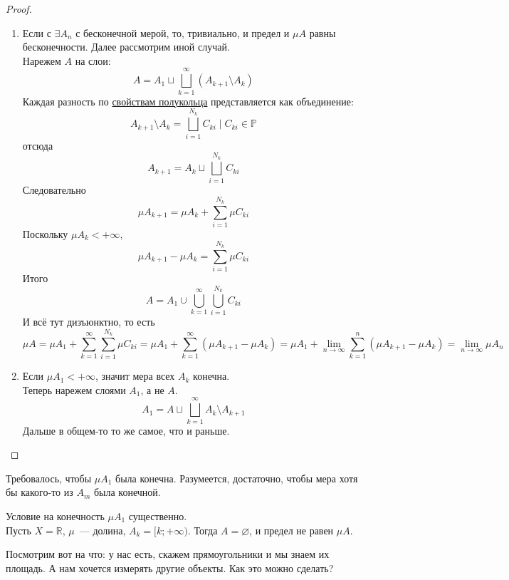 \documentclass{article}
\begin{document}
    \begin{proof}
        \begin{enumerate}
            \item
            Если с $\exists A_n$ с бесконечной мерой, то, тривиально, и предел и $\mu A$ равны бесконечности. Далее рассмотрим иной случай.\\
            Нарежем $A$ на слои:
            $$
            A=A_1\sqcup\bigsqcup\limits_{k=1}^\infty(A_{k+1}\setminus A_k)
            $$
            Каждая разность по \hyperref[prop:1 полукольца]{свойствам полукольца} представляется как объединение:
            $$
            A_{k+1}\setminus A_k=\bigsqcup\limits_{i=1}^{N_k}C_{ki}\mid C_{ki}\in\mathbb P
            $$
            отсюда
            $$
            A_{k+1}=A_k\sqcup\bigsqcup\limits_{i=1}^{N_k}C_{ki}
            $$
            Следовательно
            $$
            \mu A_{k+1}=\mu A_k+\sum\limits_{i=1}^{N_k}\mu C_{ki}
            $$
            Поскольку $\mu A_k<+\infty$,
            $$
            \mu A_{k+1}-\mu A_k=\sum\limits_{i=1}^{N_k}\mu C_{ki}
            $$
            Итого
            $$
            A=A_1\cup\bigcup\limits_{k=1}^\infty\bigcup\limits_{i=1}^{N_k}C_{ki}
            $$
            И всё тут дизъюнктно, то есть
            $$
            \mu A=\mu A_1+\sum\limits_{k=1}^\infty\sum\limits_{i=1}^{N_k}\mu C_{ki}=\mu A_1+\sum\limits_{k=1}^\infty(\mu A_{k+1}-\mu A_k)=\mu A_1+\lim_{n\to\infty}\sum\limits_{k=1}^n(\mu A_{k+1}-\mu A_k)=\lim_{n\to\infty}\mu A_n
            $$
            \item Если $\mu A_1<+\infty$, значит мера всех $A_k$ конечна.\\
            Теперь нарежем слоями $A_1$, а не $A$.
            $$
            A_1=A\sqcup\bigsqcup\limits_{k=1}^\infty A_k\setminus A_{k+1}
            $$
            Дальше в общем-то то же самое, что и раньше.
        \end{enumerate}
    \end{proof}
    \begin{remark}
        Требовалось, чтобы $\mu A_1$ была конечна. Разумеется, достаточно, чтобы мера хотя бы какого-то из $A_m$ была конечной.
    \end{remark}
    \begin{remark}
       Условие на конечность $\mu A_1$ существенно.\\
       Пусть $X=\mathbb R$, $\mu$~--- долина, $A_k=[k;+\infty)$. Тогда $A=\varnothing$, и предел не равен $\mu A$.
    \end{remark}
    \begin{remark}
        Посмотрим вот на что: у нас есть, скажем прямоугольники и мы знаем их площадь. А нам хочется измерять другие объекты. Как это можно сделать?
    \end{remark}
\end{document}

